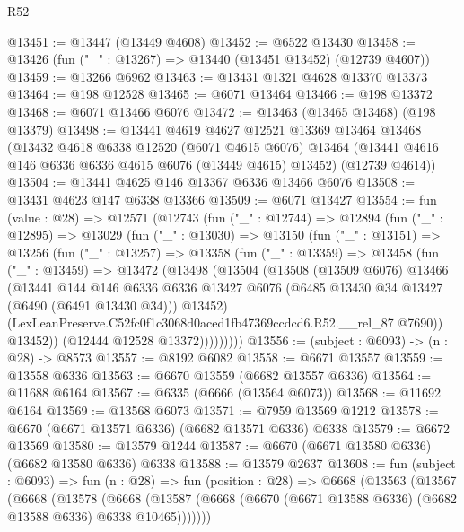 \begin{lexlean}{R52}
\begin{coremodule}
@13451 := @13447 (@13449 @4608)
@13452 := @6522 @13430
@13458 := @13426 (fun ("_" : @13267) => @13440 (@13451 @13452) (@12739 @4607))
@13459 := @13266 @6962
@13463 := @13431 @1321 @4628 @13370 @13373
@13464 := @198 @12528
@13465 := @6071 @13464
@13466 := @198 @13372
@13468 := @6071 @13466 @6076
@13472 := @13463 (@13465 @13468) (@198 @13379)
@13498 := @13441
    @4619
    @4627
    @12521
    @13369
    @13464
    @13468
    (@13432
      @4618
      @6338
      @12520
      (@6071 @4615 @6076)
      @13464
      (@13441 @4616 @146 @6336 @6336 @4615 @6076 (@13449 @4615) @13452)
      (@12739 @4614))
@13504 := @13441 @4625 @146 @13367 @6336 @13466 @6076
@13508 := @13431 @4623 @147 @6338 @13366
@13509 := @6071 @13427
@13554 := fun (value : @28) =>
  @12571
    (@12743
      (fun ("_" : @12744) =>
      @12894
        (fun ("_" : @12895) =>
        @13029
          (fun ("_" : @13030) =>
          @13150
            (fun ("_" : @13151) =>
            @13256
              (fun ("_" : @13257) =>
              @13358
                (fun ("_" : @13359) =>
                @13458
                  (fun ("_" : @13459) =>
                  @13472
                    (@13498
                      (@13504
                        (@13508
                          (@13509 @6076)
                          @13466
                          (@13441
                            @144
                            @146
                            @6336
                            @6336
                            @13427
                            @6076
                            (@6485 @13430 @34 @13427 (@6490 (@6491 @13430 @34)))
                            @13452)
                          (LexLeanPreserve.C52fc0f1c3068d0aced1fb47369ccdcd6.R52.__rel_87 @7690))
                        @13452))
                    (@12444 @12528 @13372)))))))))
@13556 := (subject : @6093) -> (n : @28) -> @8573
@13557 := @8192 @6082
@13558 := @6671 @13557
@13559 := @13558 @6336
@13563 := @6670 @13559 (@6682 @13557 @6336)
@13564 := @11688 @6164
@13567 := @6335 (@6666 (@13564 @6073))
@13568 := @11692 @6164
@13569 := @13568 @6073
@13571 := @7959 @13569 @1212
@13578 := @6670 (@6671 @13571 @6336) (@6682 @13571 @6336) @6338
@13579 := @6672 @13569
@13580 := @13579 @1244
@13587 := @6670 (@6671 @13580 @6336) (@6682 @13580 @6336) @6338
@13588 := @13579 @2637
@13608 := fun (subject : @6093) =>
  fun (n : @28) =>
  fun (position : @28) =>
  @6668
    (@13563
      (@13567
        (@6668
          (@13578
            (@6668
              (@13587 (@6668 (@6670 (@6671 @13588 @6336) (@6682 @13588 @6336) @6338 @10465)))))))

\end{coremodule}
\end{lexlean}
